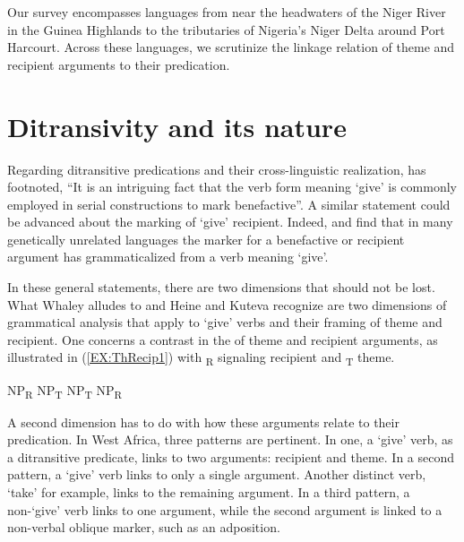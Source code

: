 \documentclass[output=paper,colorlinks,citecolor=brown]{langscibook}
\begin{document}
\begin{sloppypar}
Our survey encompasses languages from near the headwaters of the Niger River in the Guinea Highlands to the tributaries of Nigeria’s Niger Delta around Port Harcourt. Across these languages, we scrutinize the linkage relation of theme and recipient arguments to their predication.
\end{sloppypar}

\section{Ditransivity and its nature}

Regarding ditransitive predications and their cross-linguistic realization, \citet[148]{Whaley1997} has footnoted, “It is an intriguing fact that the verb form meaning ‘give’ is commonly employed in serial constructions to mark benefactive”. A similar statement could be advanced about the marking of ‘give’ recipient. Indeed, \citet[149--154]{HeineKuteva2002} and  \citet{Kutevaetal2019} find that in many genetically unrelated languages the marker for a benefactive or recipient argument has  grammaticalized from a verb meaning ‘give’.

In these general statements, there are two dimensions that should not be lost. What Whaley alludes to and Heine and Kuteva recognize are two dimensions of grammatical analysis that apply to ‘give’ verbs and their framing of theme and recipient. One concerns a contrast in the  of theme and recipient arguments, as illustrated in (\ref{EX:ThRecip1}) with \textsubscript{R} signaling recipient and \textsubscript{T} theme.

\ea \label{EX:ThRecip1}
\ea NP\textsubscript{R} NP\textsubscript{T}
\ex NP\textsubscript{T} NP\textsubscript{R}
\z
\z


A second dimension has to do with how these arguments relate to their predication. In West Africa, three patterns are pertinent. In one, a ‘give’ verb, as a ditransitive predicate, links to two arguments: recipient and theme. In a second pattern, a ‘give’ verb links to only a single argument. Another distinct verb, ‘take’ for example, links to the remaining argument. In a third pattern, a non-`give' verb links to one argument, while the second argument is linked to a non-verbal oblique marker, such as an adposition.
\end{document}

